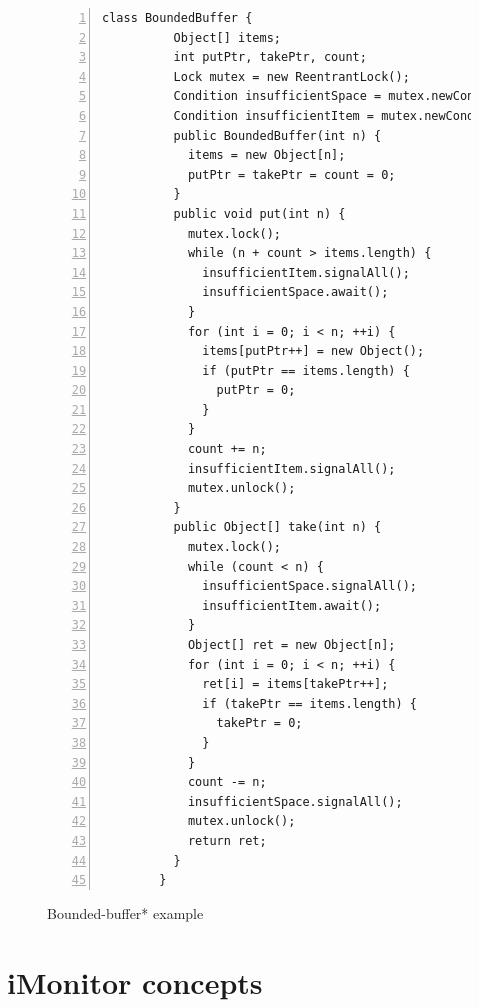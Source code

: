 \documentclass[preprint]{sigplanconf}
\begin{document}
\begin{figure}[ht!]
    \begin{Verbatim}[fontsize=\footnotesize,gobble=8,frame=lines,
            framesep=5mm,numbers=left,numbersep=2pt,
            label=\fbox{\small\emph{Explicit-Signal}}]
        class BoundedBuffer {
          Object[] items;  
          int putPtr, takePtr, count;
          Lock mutex = new ReentrantLock();
          Condition insufficientSpace = mutex.newCondition();
          Condition insufficientItem = mutex.newCondition();
          public BoundedBuffer(int n) {
            items = new Object[n];
            putPtr = takePtr = count = 0;
          }
          public void put(int n) {
            mutex.lock();
            while (n + count > items.length) {
              insufficientItem.signalAll();
              insufficientSpace.await();
            }
            for (int i = 0; i < n; ++i) {
              items[putPtr++] = new Object();
              if (putPtr == items.length) {
                putPtr = 0;
              }
            }
            count += n;
            insufficientItem.signalAll();
            mutex.unlock();
          }
          public Object[] take(int n) {
            mutex.lock();
            while (count < n) {
              insufficientSpace.signalAll();
              insufficientItem.await();
            }
            Object[] ret = new Object[n];
            for (int i = 0; i < n; ++i) {
              ret[i] = items[takePtr++];
              if (takePtr == items.length) {
                takePtr = 0;
              }
            }
            count -= n;
            insufficientSpace.signalAll();
            mutex.unlock();
            return ret;
          }
        }
    \end{Verbatim}
    \caption{Bounded-buffer* example}
    \label{fig:sigAll_exp}
\end{figure}


\section{iMonitor concepts} \label{sec:concept}
\end{document}
